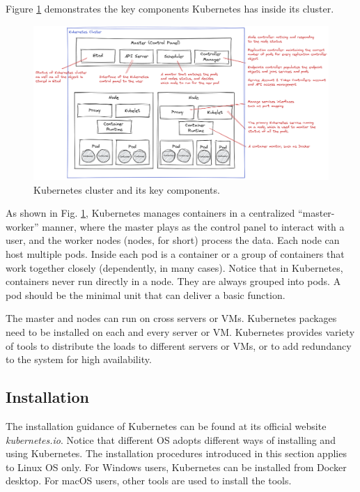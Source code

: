 Figure \ref{ch:vac:fig:kubernetescluster} demonstrates the key components Kubernetes has inside its cluster.
\begin{figure}
	\centering
	\includegraphics[width=350pt]{chapters/ch-virtualization-and-containerization/figures/kubernetescluster.png}
	\caption{Kubernetes cluster and its key components.} \label{ch:vac:fig:kubernetescluster}
\end{figure}
As shown in Fig. \ref{ch:vac:fig:kubernetescluster}, Kubernetes manages containers in a centralized ``master-worker'' manner, where the master plays as the control panel to interact with a user, and the worker nodes (nodes, for short) process the data. Each node can host multiple pods. Inside each pod is a container or a group of containers that work together closely (dependently, in many cases). Notice that in Kubernetes, containers never run directly in a node. They are always grouped into pods. A pod should be the minimal unit  that can deliver a basic function.

The master and nodes can run on cross servers or VMs. Kubernetes packages need to be installed on each and every server or VM. Kubernetes provides variety of tools to distribute the loads to different servers or VMs, or to add redundancy to the system for high availability.

\subsection{Installation}

The installation guidance of Kubernetes can be found at its official website \textit{kubernetes.io}. Notice that different OS adopts different ways of installing and using Kubernetes. The installation procedures introduced in this section applies to Linux OS only. For Windows users, Kubernetes can be installed from Docker desktop. For macOS users, other tools are used to install the tools.

